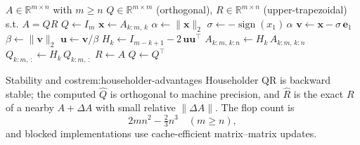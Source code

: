 \documentclass[../../main.tex]{subfiles}
\begin{document}
\begin{algorithm}[H]
  \caption{QR Decomposition via Householder Reflections (full \(Q\))}
  \begin{algorithmic}[1]
    \Require $A \in \mathbb{R}^{m \times n}$ with $m \ge n$
    \Ensure $Q \in \mathbb{R}^{m \times m}$ (orthogonal), $R \in \mathbb{R}^{m \times n}$ (upper-trapezoidal) s.t. $A = QR$
    \State $Q \gets I_m$
      \State $\mathbf{x} \gets A_{k:m,\,k}$
        \State $\alpha \gets \|\mathbf{x}\|_2$
        \State $\sigma \gets -\operatorname{sign}(x_1)\,\alpha$ 
        \State $\mathbf{v} \gets \mathbf{x} - \sigma\,\mathbf{e}_1$
        \State $\beta \gets \|\mathbf{v}\|_2$
          \State $\mathbf{u} \gets \mathbf{v}/\beta$
          \State $H_k \gets I_{m-k+1} - 2\,\mathbf{u}\mathbf{u}^\top$ 
          \State $A_{k:m,\,k:n} \gets H_k\,A_{k:m,\,k:n}$
          \State $Q_{k:m,\,:} \gets H_k\,Q_{k:m,\,:}$
        \EndIf
      \EndIf
    \EndFor
    \State $R \gets A$ 
    \State $Q \gets Q^\top$ 
  \end{algorithmic}
\end{algorithm}

\begin{remark}{Stability and cost}{rem:householder-advantages}
    Householder QR is backward stable; the computed $\widehat{Q}$ is orthogonal to machine precision, and $\widehat{R}$ is the exact $R$ of a nearby $A+\Delta A$ with small relative $\|\Delta A\|$. The flop count is
    \[
        2mn^2 - \tfrac{2}{3}n^3\quad (m\ge n),
    \]
    and blocked implementations use cache-efficient matrix–matrix updates.
\end{remark}
\end{document}
